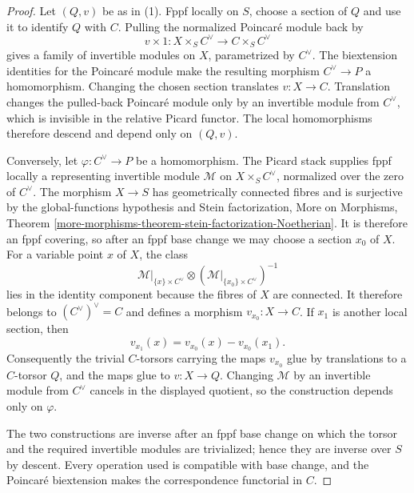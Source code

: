 \begin{proof}
Let $(Q, v)$ be as in (1). Fppf locally on $S$, choose a section of $Q$ and
use it to identify $Q$ with $C$. Pulling the normalized Poincar\'e module back
by
$$
v \times 1 : X \times_S C^\vee \longrightarrow C \times_S C^\vee
$$
gives a family of invertible modules on $X$, parametrized by $C^\vee$. The
biextension identities for the Poincar\'e module make the resulting morphism
$C^\vee \to P$ a homomorphism. Changing the chosen section translates
$v : X \to C$. Translation changes the pulled-back Poincar\'e module only by
an invertible module from $C^\vee$, which is invisible in the relative Picard
functor. The local homomorphisms therefore descend and depend only on
$(Q, v)$.

Conversely, let $\varphi : C^\vee \to P$ be a homomorphism. The Picard stack
supplies fppf locally a representing invertible module $\mathcal{M}$ on
$X \times_S C^\vee$, normalized over the zero of $C^\vee$. The morphism
$X \to S$ has geometrically connected fibres and is surjective by the
global-functions hypothesis and Stein factorization, More on Morphisms,
Theorem \ref{more-morphisms-theorem-stein-factorization-Noetherian}. It is
therefore an fppf covering, so after an fppf base change we may choose a
section $x_0$ of $X$. For a variable point $x$ of $X$, the class
$$
\mathcal{M}|_{\{x\} \times C^\vee}
\otimes
\left(\mathcal{M}|_{\{x_0\} \times C^\vee}\right)^{-1}
$$
lies in the identity component because the fibres of $X$ are connected. It
therefore belongs to $(C^\vee)^\vee = C$ and defines a morphism
$v_{x_0} : X \to C$. If $x_1$ is another local section, then
$$
v_{x_1}(x) = v_{x_0}(x) - v_{x_0}(x_1).
$$
Consequently the trivial $C$-torsors carrying the maps $v_{x_0}$ glue by
translations to a $C$-torsor $Q$, and the maps glue to $v : X \to Q$.
Changing $\mathcal{M}$ by an invertible module from $C^\vee$ cancels in the
displayed quotient, so the construction depends only on $\varphi$.

The two constructions are inverse after an fppf base change on which the
torsor and the required invertible modules are trivialized; hence they are
inverse over $S$ by descent. Every operation used is compatible with base
change, and the Poincar\'e biextension makes the correspondence functorial in
$C$.
\end{proof}

